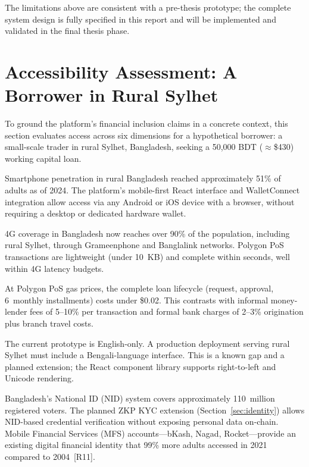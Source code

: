 \documentclass[12pt,a4paper]{report}
\begin{document}
The limitations above are consistent with a pre-thesis prototype; the complete system design is fully specified in this report and will be implemented and validated in the final thesis phase.

\section{Accessibility Assessment: A Borrower in Rural Sylhet}

To ground the platform's financial inclusion claims in a concrete context, this section evaluates access across six dimensions for a hypothetical borrower: a small-scale trader in rural Sylhet, Bangladesh, seeking a 50,000 BDT ($\approx$\$430) working capital loan.

\begin{description}[leftmargin=0pt]

\item[\textbf{1. Device access.}] Smartphone penetration in rural Bangladesh reached approximately 51\% of adults as of 2024. The platform's mobile-first React interface and WalletConnect integration allow access via any Android or iOS device with a browser, without requiring a desktop or dedicated hardware wallet.

\item[\textbf{2. Connectivity.}] 4G coverage in Bangladesh now reaches over 90\% of the population, including rural Sylhet, through Grameenphone and Banglalink networks. Polygon PoS transactions are lightweight (under 10~KB) and complete within seconds, well within 4G latency budgets.

\item[\textbf{3. Transaction cost.}] At Polygon PoS gas prices, the complete loan lifecycle (request, approval, 6~monthly installments) costs under \$0.02. This contrasts with informal money-lender fees of 5--10\% per transaction and formal bank charges of 2--3\% origination plus branch travel costs.

\item[\textbf{4. Language and literacy.}] The current prototype is English-only. A production deployment serving rural Sylhet must include a Bengali-language interface. This is a known gap and a planned extension; the React component library supports right-to-left and Unicode rendering.

\item[\textbf{5. Identity and onboarding.}] Bangladesh's National ID (NID) system covers approximately 110~million registered voters. The planned ZKP KYC extension (Section~\ref{sec:identity}) allows NID-based credential verification without exposing personal data on-chain. Mobile Financial Services (MFS) accounts---bKash, Nagad, Rocket---provide an existing digital financial identity that 99\% more adults accessed in 2021 compared to 2004~[R11].


\end{description}
\end{document}
